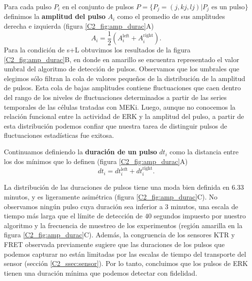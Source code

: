 \documentclass[./main.tex]{subfiles}
\begin{document}
 Para cada pulso $P_i$ en el conjunto de pulsos $P= \lbrace P_j=(j, kj, lj) | P_j \text{ es un pulso} \rbrace$ definimos la \textbf{amplitud del pulso} $A_i$ como el promedio de sus amplitudes derecha e izquierda (figura \ref{C2_fig:amp_durac}A) 
\begin{equation}
    A_i = \frac{1}{2} (A_i^{\text{left}} +  A_i^{\text{right}}).
\end{equation}
Para la condición de s+L obtuvimos los resultados de la figura \ref{C2_fig:amp_durac}B, en donde en  amarillo se encuentra representado el valor umbral del algoritmo de detección de pulsos. Observamos que los umbrales que elegimos sólo filtran la cola de valores pequeños de la distribución de la amplitud de pulsos. Esta cola de bajas amplitudes contiene fluctuaciones que caen dentro del rango de los niveles de fluctuaciones determinados a partir de las series temporales de las células tratadas con MEKi. Luego, aunque no conocemos la relación funcional entre la actividad de ERK y la amplitud del pulso, a partir de esta distribución podemos confiar que nuestra tarea de distinguir pulsos de fluctuaciones estadísticas fue exitosa.


Continuamos definiendo la \textbf{duración de un pulso} $dt_i$ como la distancia entre los dos mínimos que lo definen (figura \ref{C2_fig:amp_durac}A) 
\begin{equation}
    dt_i = dt_i^{\text{left}} + dt_i^{\text{right}}.
    \label{C2_eq:duracion_de_pulsos}
\end{equation}


 La distribución de las duraciones de pulsos tiene una moda bien definida en $6.33$ minutos, y es ligeramente asimétrica (figura \ref{C2_fig:amp_durac}C). No observamos ningún pulso cuya duración sea inferior a $3$ minutos, una escala de tiempo más larga que el límite de detección de $40$ segundos impuesto por nuestro algoritmo y la frecuencia de muestreo de los experimentos (región amarilla en la figura \ref{C2_fig:amp_durac}C). Además, la congruencia de los sensores KTR y FRET observada previamente sugiere que las duraciones de los pulsos que podemos capturar no están limitadas por las escalas de tiempo del transporte del sensor (sección \ref{C2_ssec:sensor}). Por lo tanto, concluimos que los pulsos de ERK tienen una duración mínima que podemos detectar con fidelidad.
\end{document}
